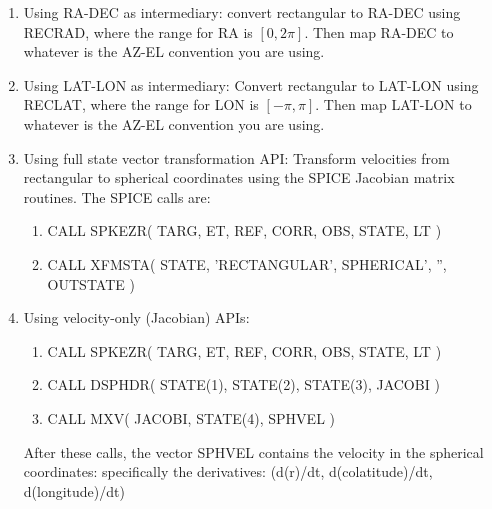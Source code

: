 \documentclass[crop=false,class=book]{standalone}
\begin{document}
\begin{enumerate}
    \item Using RA-DEC as intermediary: convert rectangular to RA-DEC using RECRAD, where the range for RA is $[0,2\pi]$. Then map RA-DEC to whatever is the AZ-EL convention you are using.
    \item Using LAT-LON as intermediary: Convert rectangular to LAT-LON using RECLAT, where the range for LON is $[-\pi,\pi]$. Then map LAT-LON to whatever is the AZ-EL convention you are using.
    \item Using full state vector transformation API: Transform velocities from rectangular to spherical coordinates using the SPICE Jacobian matrix routines. The SPICE calls are:
    \begin{enumerate}
        \item CALL SPKEZR( TARG, ET, REF, CORR, OBS, STATE, LT )
        \item CALL XFMSTA( STATE, 'RECTANGULAR', SPHERICAL', '', OUTSTATE )
    \end{enumerate}
    \item Using velocity-only (Jacobian) APIs:
    \begin{enumerate}
        \item CALL SPKEZR( TARG, ET, REF, CORR, OBS, STATE, LT )
        \item CALL DSPHDR( STATE(1), STATE(2), STATE(3), JACOBI )
        \item CALL MXV( JACOBI, STATE(4), SPHVEL )
    \end{enumerate}
    After these calls, the vector SPHVEL contains the velocity in the spherical coordinates: specifically the derivatives: (d(r)/dt, d(colatitude)/dt, d(longitude)/dt)
\end{enumerate}
\end{document}
